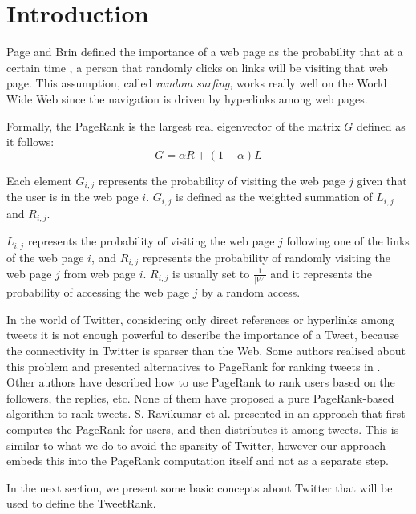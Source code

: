 \section{Introduction}
Page and Brin defined the importance of a web page as the probability that at a certain time \cite{pagebmw98}, a person that randomly clicks on links will be visiting that web page. This assumption, called \emph{random surfing}, works really well on the World Wide Web since the navigation is driven by hyperlinks among web pages. 

Formally, the PageRank is the largest real eigenvector of the matrix $G$ defined as it follows:
\begin{equation}\label{eq:basic_pr}
G = \alpha R + (1-\alpha) L
\end{equation}

Each element $G_{i,j}$ represents the probability of visiting the web page $j$ given that the user is in the web page $i$. $G_{i,j}$ is defined as the weighted summation of $L_{i,j}$ and $R_{i,j}$.

$L_{i,j}$ represents the probability of visiting the web page $j$ following one of the links of the web page $i$, and $R_{i,j}$ represents the probability of randomly visiting the web page $j$ from web page $i$. $R_{i,j}$ is usually set to $\frac{1}{|W|}$ and it represents the probability of accessing the web page $j$ by a random access. 

In the world of Twitter, considering only direct references or hyperlinks among tweets it is not enough powerful to describe the importance of a Tweet, because the connectivity in Twitter is sparser than the Web. Some authors realised about this problem and presented alternatives to PageRank for ranking tweets in \cite{Duan:2010:ESL:1873781.1873815,DBLP:conf/webi/NagmotiTC10}. Other authors \cite{Duan:2010:ESL:1873781.1873815,Kwak:2010:TSN:1772690.1772751,DBLP:conf/wsdm/WelchSHC11} have described how to use PageRank to rank users based on the followers, the replies, etc. None of them have proposed a pure PageRank-based algorithm to rank tweets. S. Ravikumar et al. presented in \cite{DBLP:journals/corr/abs-1204-0156} an approach that first computes the PageRank for users, and then distributes it among tweets. This is similar to what we do to avoid the sparsity of Twitter, however our approach embeds this into the PageRank computation itself and not as a separate step.

In the next section, we present some basic concepts about Twitter that will be used to define the TweetRank.